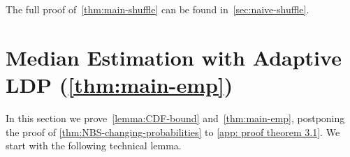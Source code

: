 The full proof of~\cref{thm:main-shuffle} can be found in~\cref{sec:naive-shuffle}.

%
%
%

%
%
%
%
%
%
%
%



%
%
%

\section{Median Estimation with Adaptive LDP (\cref{thm:main-emp})}\label{sec:proof-of-main-adaptive-up}

In this section we prove~\cref{lemma:CDF-bound} and~\cref{thm:main-emp}, postponing the proof of \cref{thm:NBS-changing-probabilities} to \cref{app: proof theorem 3.1}.
%
We start with the following technical lemma.

